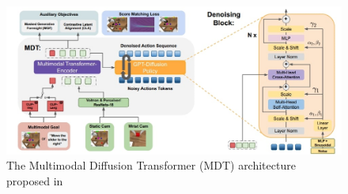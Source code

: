 \begin{figure}[t]
    \centering
    \includegraphics[width=\textwidth]{figures/images/mdt/mdt_architecture.jpg}
    \caption{The Multimodal Diffusion Transformer (MDT) architecture proposed in \cite{reuss2024multimodal}}
    \label{fig:mdt_architecture}
\end{figure}